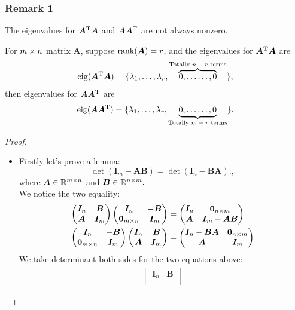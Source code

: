 \subsubsection{Remark 1}
The eigenvalues for $\bm A^{\mathrm T}\bm A$ and $\bm A\bm A^{\mathrm T}$ are not always nonzero.
\begin{proposition}
For $m\times n$ matrix $\bm A$, suppose $\operatorname{rank}(\bm A)=r$,
and the eigenvalues for $\bm A^{\mathrm T}\bm A$ are 
\[
\operatorname{eig}(\bm A^{\mathrm T}\bm A)=\{\lambda_1,\dots,\lambda_r,\overbrace{0,\dots\dots,0}^{\text{Totally $n-r$ terms}}\}, 
\]
then eigenvalues for $\bm A\bm A^{\mathrm T}$ are
\[
\operatorname{eig}(\bm A\bm A^{\mathrm T})=\{\lambda_1,\dots,\lambda_r,\underbrace{0,\dots\dots,0}_{\text{Totally $m-r$ terms}}\}.
\]
\end{proposition}
\begin{proof}
\begin{itemize}
\item
Firstly let's prove a lemma:
\[
\det(\bm I_m-\bm{AB})=\det(\bm I_n-\bm{BA}).,
\]
where $\bm A\in\mathbb{R}^{m\times n}$ and $\bm B\in\mathbb{R}^{n\times m}.$\\
We notice the two equality:
\begin{align}
\begin{pmatrix}
\bm I_n&\bm B\\
\bm A&\bm I_m
\end{pmatrix}\begin{pmatrix}
\bm I_n&-\bm B\\
\bm 0_{m\times n}&\bm I_m
\end{pmatrix}
&=\begin{pmatrix}
\bm I_n&\bm 0_{n\times m}\\
\bm A&\bm I_m-\bm{AB}
\end{pmatrix}\\
\begin{pmatrix}
\bm I_n&-\bm B\\
\bm 0_{m\times n}&\bm I_m
\end{pmatrix}
\begin{pmatrix}
\bm I_n&\bm B\\
\bm A&\bm I_m
\end{pmatrix}
&=\begin{pmatrix}
\bm I_n-\bm{BA}&\bm 0_{n\times m}\\
\bm A&\bm I_m
\end{pmatrix}
\end{align}
We take determinant both sides for the two equations above:
\begin{align}
\begin{vmatrix}
\bm I_n&\bm B\\

\end{vmatrix}
\end{align}
\end{itemize}
\end{proof}
